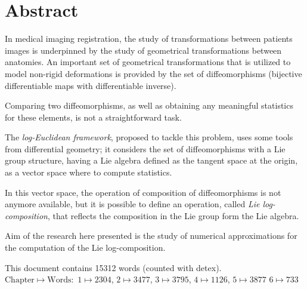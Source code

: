 
\qquad
\pagestyle{empty}
\newpage



\section*{Abstract}


In medical imaging registration, the study of transformations between patients images is underpinned by the study of geometrical transformations between anatomies. An important set of geometrical transformations that is utilized to model non-rigid deformations is provided by the set of diffeomorphisms (bijective differentiable maps with differentiable inverse).

Comparing two diffeomorphisms, as well as obtaining any meaningful statistics for these elements, is not a straightforward task.

The \emph{log-Euclidean framework}, proposed to tackle this problem, uses some tools from differential geometry; it considers the set of diffeomorphisms with a Lie group structure, having a Lie algebra defined as the tangent space at the origin, as a vector space where to compute statistics.

In this vector space, the operation of composition of diffeomorphisms is not anymore available, but it is possible to define an operation, called \emph{Lie log-composition}, that reflects the composition in the Lie group form the Lie algebra.

Aim of the research here presented is the study of numerical approximations for the computation of the Lie log-composition. 


\vspace{1cm}

\noindent
This document contains 15312 words (counted with detex).\\
$ \text{Chapter} \mapsto \text{Words}:$ 
$1 \mapsto 2304$,
$2 \mapsto 3477 $,
$3 \mapsto 3795 $,
$4 \mapsto 1126 $,
$5 \mapsto 3877$
$6 \mapsto 733$

\qquad
\pagestyle{empty}
\newpage


